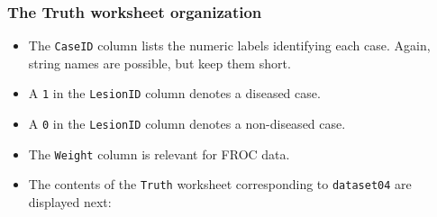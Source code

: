 \documentclass[]{book}
\providecommand{\tightlist}{%
  \setlength{\itemsep}{0pt}\setlength{\parskip}{0pt}}
\begin{document}
\hypertarget{the-truth-worksheet-organization-1}{%
\subsubsection{The Truth worksheet organization}\label{the-truth-worksheet-organization-1}}

\begin{itemize}
\tightlist
\item
  The \texttt{CaseID} column lists the numeric labels identifying each case. Again, string names are possible, but keep them short.
\item
  A \texttt{1} in the \texttt{LesionID} column denotes a diseased case.
\item
  A \texttt{0} in the \texttt{LesionID} column denotes a non-diseased case.
\item
  The \texttt{Weight} column is relevant for FROC data.
\item
  The contents of the \texttt{Truth} worksheet corresponding to \texttt{dataset04} are displayed next:
\end{itemize}
\end{document}
